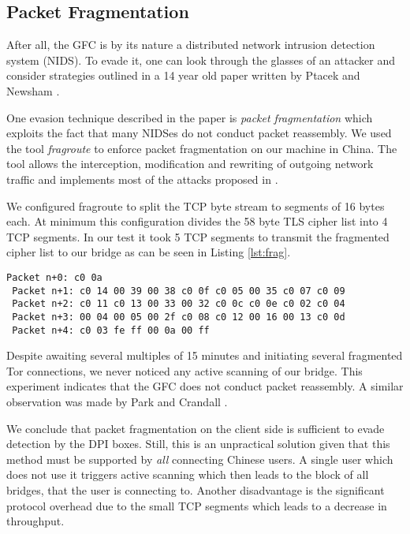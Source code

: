 \documentclass[runningheads,a4paper]{llncs}
\begin{document}
\subsection{Packet Fragmentation}
After all, the GFC is by its nature a distributed network intrusion detection system (NIDS). To
evade it, one can look through the glasses of an attacker and consider strategies outlined in a 14
year old paper written by Ptacek and Newsham \cite{Ptacek1998}.

One evasion technique described in the paper is \emph{packet fragmentation} which exploits the fact
that many NIDSes do not conduct packet reassembly. We used the tool \emph{fragroute}
\cite{fragroute} to enforce packet fragmentation on our machine in China. The tool allows the
interception, modification and rewriting of outgoing network traffic and implements most of the
attacks proposed in \cite{Ptacek1998}.

We configured fragroute to split the TCP byte stream to segments of 16 bytes each. At minimum this
configuration divides the 58 byte TLS cipher list into 4 TCP segments. In our test it took 5 TCP
segments to transmit the fragmented cipher list to our bridge as can be seen in Listing
\ref{lst:frag}.

\begin{lstlisting}[basicstyle=\footnotesize\ttfamily,caption={Fragmentation of the cipher list.},
label={lst:frag},captionpos=b]
 Packet n+0: c0 0a
 Packet n+1: c0 14 00 39 00 38 c0 0f c0 05 00 35 c0 07 c0 09
 Packet n+2: c0 11 c0 13 00 33 00 32 c0 0c c0 0e c0 02 c0 04
 Packet n+3: 00 04 00 05 00 2f c0 08 c0 12 00 16 00 13 c0 0d
 Packet n+4: c0 03 fe ff 00 0a 00 ff
\end{lstlisting}

Despite awaiting several multiples of 15 minutes and initiating several fragmented Tor connections,
we never noticed any active scanning of our bridge. This experiment indicates that the GFC does not
conduct packet reassembly. A similar observation was made by Park and Crandall \cite{Park2010}.

We conclude that packet fragmentation on the client side is sufficient to evade detection by the DPI
boxes. Still, this is an unpractical solution given that this method must be supported by \emph{all}
connecting Chinese users. A single user which does not use it triggers active scanning which then
leads to the block of all bridges, that the user is connecting to. Another disadvantage is the
significant protocol overhead due to the small TCP segments which leads to a decrease in throughput.
\end{document}
